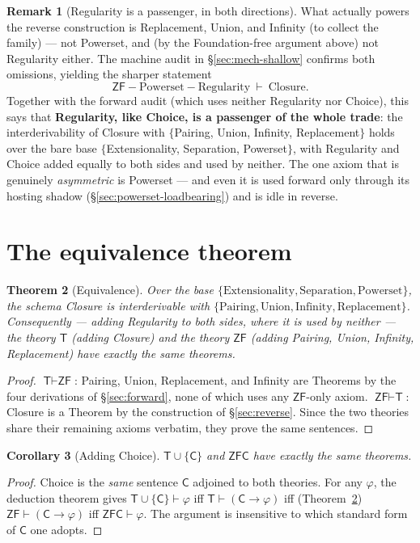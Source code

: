 \documentclass[11pt]{article}
\theoremstyle{plain}
\newtheorem{theorem}{Theorem}[section]
\newtheorem{corollary}[theorem]{Corollary}
\theoremstyle{definition}
\newtheorem{remark}[theorem]{Remark}
\newcommand{\ZF}{\mathsf{ZF}}
\renewcommand{\ZF}{\textsf{ZF}}
\newcommand{\ZFC}{\textsf{ZFC}}
\newcommand{\T}{\textsf{T}}
\newcommand{\proves}{\vdash}
\begin{document}
\begin{remark}[Regularity is a passenger, in both directions]
\label{rem:mirror}
What actually powers the reverse construction is Replacement, Union, and Infinity (to
collect the family) --- not Powerset, and (by the Foundation-free argument above) not
Regularity either. The machine audit in \S\ref{sec:mech-shallow} confirms both
omissions, yielding the sharper statement
\[
  \ZF - \text{Powerset} - \text{Regularity} \ \proves\ \text{Closure}.
\]
Together with the forward audit (which uses neither Regularity nor Choice), this says
that \textbf{Regularity, like Choice, is a passenger of the whole trade}: the
interderivability of Closure with $\{$Pairing, Union, Infinity, Replacement$\}$ holds
over the bare base $\{$Extensionality, Separation, Powerset$\}$, with Regularity and
Choice added equally to both sides and used by neither. The one axiom that is
genuinely \emph{asymmetric} is Powerset --- and even it is used forward only through
its hosting shadow (\S\ref{sec:powerset-loadbearing}) and is idle in reverse.
\end{remark}

\section{The equivalence theorem}\label{sec:equivalence}

\begin{theorem}[Equivalence]\label{thm:equiv}
Over the base $\{\text{Extensionality}, \text{Separation}, \text{Powerset}\}$, the
schema Closure is interderivable with $\{\text{Pairing}, \text{Union},
\text{Infinity}, \text{Replacement}\}$. Consequently --- adding Regularity to both
sides, where it is used by neither --- the theory $\T$ (adding Closure) and the
theory $\ZF$ (adding Pairing, Union, Infinity, Replacement) have exactly the same
theorems.
\end{theorem}
\begin{proof}
$\T \proves \ZF$: Pairing, Union, Replacement, and Infinity are
Theorems by the four derivations of \S\ref{sec:forward}, none of which uses any
$\ZF$-only axiom. $\ZF \proves \T$: Closure is a Theorem by the construction of
\S\ref{sec:reverse}. Since the two theories share their remaining axioms verbatim,
they prove the same sentences.
\end{proof}

\begin{corollary}[Adding Choice]\label{cor:addC}
$\T \cup \{\mathsf C\}$ and $\ZFC$ have exactly the same theorems.
\end{corollary}
\begin{proof}
Choice is the \emph{same} sentence $\mathsf C$ adjoined to both theories. For any
$\varphi$, the deduction theorem gives $\T \cup \{\mathsf C\} \proves \varphi$ iff
$\T \proves (\mathsf C \to \varphi)$ iff (Theorem~\ref{thm:equiv})
$\ZF \proves (\mathsf C \to \varphi)$ iff $\ZFC \proves \varphi$. The argument is
insensitive to which standard form of $\mathsf C$ one adopts.
\end{proof}
\end{document}
